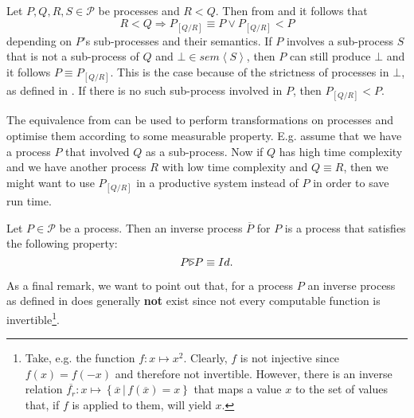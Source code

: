 \begin{corollary}
Let $P, Q, R, S \in \mathcal{P}$ be processes and $R < Q$. Then from  and  it follows that
  \begin{equation}
    R < Q \Rightarrow P_{\left[ Q / R \right]} \equiv P \lor P_{\left[ Q / R \right]} < P
  \end{equation}
  depending on $P$'s sub-processes and their semantics. If $P$ involves a sub-process $S$ that is not a sub-process of $Q$ and $\bot \in sem \left\langle S \right\rangle$, then $P$ can still produce $\bot$ and it follows $P \equiv P_{\left[Q / R \right]}$. This is the case because of the strictness of processes in $\bot$, as defined in . If there is no such sub-process involved in $P$, then $P_{\left[Q / R \right]} < P$.
    
  \hfill\qedsymbol
\end{corollary}

The equivalence from  can be used to perform transformations on processes and optimise them according to some measurable property. E.g. assume that we have a process $P$ that involved $Q$ as a sub-process. Now if $Q$ has high time complexity and we have another process $R$ with low time complexity and $Q \equiv R$, then we might want to use $P_{\left[ Q / R \right]}$ in a productive system instead of $P$ in order to save run time.


\begin{definition}
\label{def:inverse_process}
Let $P \in \mathcal{P}$ be a process. Then an inverse process $\overline{P}$ for $P$ is a process that satisfies the following property:
  \begin{equation}
    P \overline {\triangleright} P \equiv Id.
  \end{equation}
  \hfill\qedsymbol
\end{definition}



As a final remark, we want to point out that, for a process $P$ an inverse process as defined in  does generally \textbf{not} exist since not every computable function is invertible\footnote{Take, e.g. the function $f \colon x \mapsto x^2$. Clearly, $f$ is not injective since $f \left( x \right) = f \left( -x \right)$ and therefore not invertible. However, there is an inverse relation $\overline{f_r} \colon x \mapsto \left\{ \overline{x} \,|\, f \left( \overline{x} \right) = x \right\}$ that maps a value $x$ to the set of values that, if $f$ is applied to them, will yield $x$.}.





